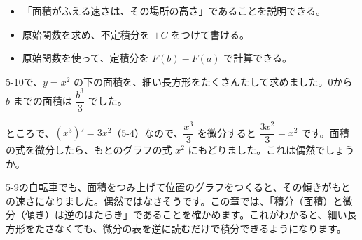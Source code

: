 
\begin{goal}
\begin{itemize}[label={\color{bkTheme}●}, leftmargin=1.6\zw, itemsep=0pt, topsep=1pt]
\item {}\enspace 「面積がふえる速さは、その場所の高さ」であることを説明できる。
\item {}\enspace 原始関数を求め、不定積分を $+C$ をつけて書ける。
\item {}\enspace 原始関数を使って、定積分を $F(b)-F(a)$ で計算できる。
\end{itemize}
\end{goal}

\begin{hatena}
\noindent\begin{minipage}[c]{0.56\linewidth}\raggedright
5-10で、$y=x^2$ の下の面積を、細い長方形をたくさんたして求めました。0から $b$ までの面積は $\dfrac{b^3}{3}$ でした。

ところで、$(x^3)'=3x^2$（5-4）なので、$\dfrac{x^3}{3}$ を微分すると $\dfrac{3x^2}{3}=x^2$ です。面積の式を微分したら、もとのグラフの式 $x^2$ にもどりました。これは偶然でしょうか。
\end{minipage}\hfill
\begin{minipage}[c]{0.4\linewidth}
\end{minipage}
\end{hatena}

5-9の自転車でも、面積をつみ上げて位置のグラフをつくると、その傾きがもとの速さになりました。偶然ではなさそうです。この章では、「積分（面積）と微分（傾き）は逆のはたらき」であることを確かめます。これがわかると、細い長方形をたさなくても、微分の表を逆に読むだけで積分できるようになります。


